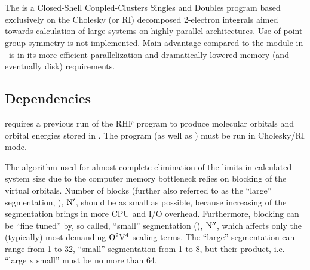 \section{}
\label{sec:chcc}
The  is a Closed-Shell Coupled-Clusters Singles and Doubles
program based exclusively on the Cholesky (or RI) decomposed 2-electron integrals
aimed towards calculation of large systems on highly parallel architectures. Use of
point-group symmetry is not implemented. Main advantage compared to the
 module in \molcas~is in its more efficient parallelization and
dramatically lowered memory (and eventually disk) requirements.

\subsection{Dependencies}
\label{sec:chcc_dependencies}

 requires a previous run of the RHF  program
to produce molecular orbitals and orbital energies stored in .
The  program (as well as ) must be run
in Cholesky/RI mode.

The algorithm used for almost complete elimination of the 
limits in calculated system size due to the computer memory bottleneck relies
on blocking of the virtual orbitals. Number of blocks (further also referred to as the
``large'' segmentation, ), $\rm N'$, should be as small as
possible, because increasing of the segmentation brings in more CPU and I/O overhead.
Furthermore, blocking can be ``fine tuned'' by, so called, ``small'' segmentation (), $\rm N''$,
which affects only the (typically) most demanding $\rm O^2V^4$ scaling
terms. The ``large'' segmentation can range from 1 to 32, ``small'' segmentation from 1 to 8, but
their product, i.e. ``large x small'' must be no more than 64.

